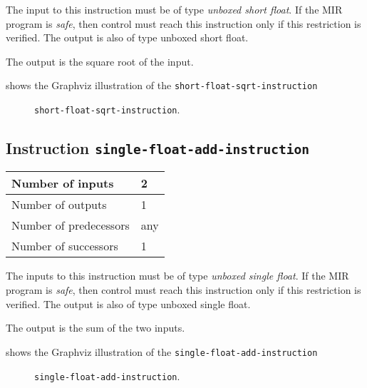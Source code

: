 The input to this instruction must be of type \emph{unboxed short
  float}.  If the MIR program is \emph{safe}, then control must reach
this instruction only if this restriction is verified.  The output is
also of type unboxed short float.

The output is the square root of the input.

 shows the Graphviz illustration of the
\texttt{short-float-sqrt-instruction}

\begin{figure}
\begin{center}
\end{center}
\caption{\label{fig-short-float-sqrt-instruction}
\texttt{short-float-sqrt-instruction}.}
\end{figure}

\subsection{Instruction \texttt{single-float-add-instruction}}
\label{mir-instruction-single-float-add}

\begin{tabular}{|l|l|}
\hline
Number of inputs & 2\\
\hline
Number of outputs & 1\\
\hline
Number of predecessors & any\\
\hline
Number of successors & 1\\
\hline
\end{tabular}

The inputs to this instruction must be of type \emph{unboxed single
  float}.  If the MIR program is \emph{safe}, then control must reach
this instruction only if this restriction is verified.  The output is
also of type unboxed single float.

The output is the sum of the two inputs.

 shows the Graphviz illustration of the
\texttt{single-float-add-instruction}

\begin{figure}
\begin{center}
\end{center}
\caption{\label{fig-single-float-add-instruction}
\texttt{single-float-add-instruction}.}
\end{figure}

